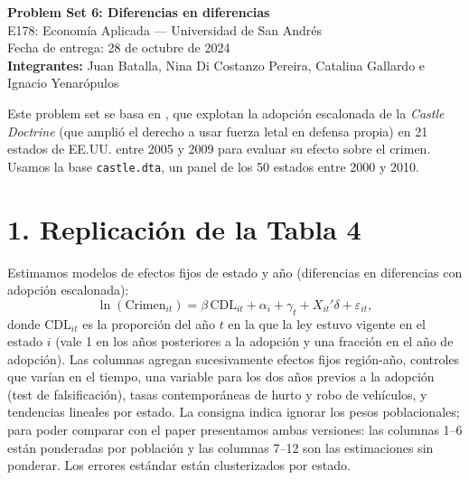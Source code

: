 \documentclass[11pt,a4paper]{article}
\begin{document}
\begin{center}
{\Large\bfseries Problem Set 6: Diferencias en diferencias}\\[0.5em]
E178: Economía Aplicada --- Universidad de San Andrés\\
Fecha de entrega: 28 de octubre de 2024\\[0.5em]
\textbf{Integrantes:} Juan Batalla, Nina Di Costanzo Pereira, Catalina Gallardo e Ignacio Yenarópulos
\end{center}

Este problem set se basa en \citet{cheng}, que explotan la adopción escalonada de la \textit{Castle Doctrine} (que amplió el derecho a usar fuerza letal en defensa propia) en 21 estados de EE.UU. entre 2005 y 2009 para evaluar su efecto sobre el crimen. Usamos la base \texttt{castle.dta}, un panel de los 50 estados entre 2000 y 2010.

\section*{1. Replicación de la Tabla 4}

Estimamos modelos de efectos fijos de estado y año (diferencias en diferencias con adopción escalonada):
\[
\ln(\text{Crimen}_{it})=\beta\,\text{CDL}_{it}+\alpha_i+\gamma_t+X_{it}'\delta+\varepsilon_{it},
\]
donde $\text{CDL}_{it}$ es la proporción del año $t$ en la que la ley estuvo vigente en el estado $i$ (vale 1 en los años posteriores a la adopción y una fracción en el año de adopción). Las columnas agregan sucesivamente efectos fijos región-año, controles que varían en el tiempo, una variable para los dos años previos a la adopción (test de falsificación), tasas contemporáneas de hurto y robo de vehículos, y tendencias lineales por estado. La consigna indica ignorar los pesos poblacionales; para poder comparar con el paper presentamos ambas versiones: las columnas 1--6 están ponderadas por población y las columnas 7--12 son las estimaciones sin ponderar. Los errores estándar están clusterizados por estado.
\end{document}
